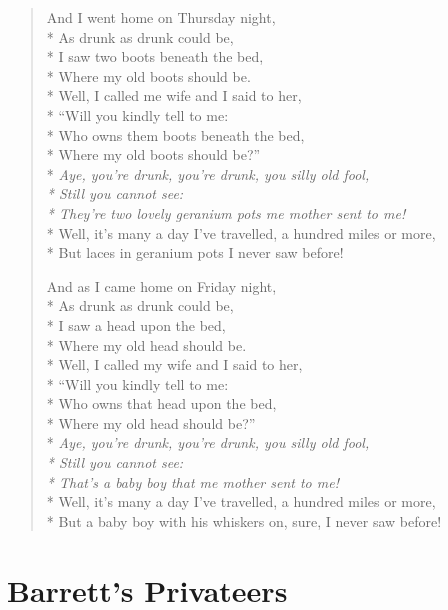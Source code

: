 \documentclass[9pt,twoside]{extarticle}
\newenvironment{xverse}{
	\begin{verse}
	\fontsize{8.5}{10.5}\selectfont
	}
	{
	\end{verse}
	\penalty 0
}
\begin{document}
\begin{xverse}
And I went home on Thursday night, \\*
As drunk as drunk could be, \\*
I saw two boots beneath the bed, \\*
Where my old boots should be. \\*
Well, I called me wife and I said to her, \\*
“Will you kindly tell to me: \\*
Who owns them boots beneath the bed, \\*
Where my old boots should be?” \\*
\textit{Aye, you’re drunk, you’re drunk, you silly old fool, \\*
Still you cannot see: \\*
They’re two lovely geranium pots me mother sent to me!} \\*
Well, it’s many a day I’ve travelled, a hundred miles or more, \\*
But laces in geranium pots I never saw before!

And as I came home on Friday night, \\*
As drunk as drunk could be, \\*
I saw a head upon the bed, \\*
Where my old head should be. \\*
Well, I called my wife and I said to her, \\*
“Will you kindly tell to me: \\*
Who owns that head upon the bed, \\*
Where my old head should be?” \\*
\textit{Aye, you’re drunk, you’re drunk, you silly old fool, \\*
Still you cannot see: \\*
That’s a baby boy that me mother sent to me!} \\*
Well, it’s many a day I’ve travelled, a hundred miles or more, \\*
But a baby boy with his whiskers on, sure, I never saw before!
\end{xverse}

\section{Barrett’s Privateers}
\end{document}
